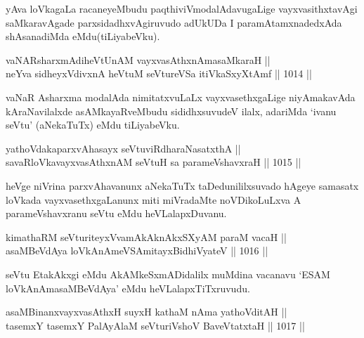 \begin{artha}
yAva loVkagaLa racaneyeMbudu paqthiviVmodalAdavugaLige vayxvasithxtavAgi saMkaravAgade parxsidadhxvAgiruvudo adUkUDa I paramAtamxnadedxAda shAsanadiMda eMdu(tiLiyabeVku).
\end{artha}


\begin{shl}
vaNARsharxmAdiheVtUnAM vayxvasAthxnAmasaMkaraH || \\
neYva sidheyxVdivxnA heVtuM seVtureVSa itiVkaSxyXtAmf \hfill || 1014 ||  
\end{shl}

\begin{artha}
vaNaR Asharxma modalAda nimitatxvuLaLx vayxvasethxgaLige niyAmakavAda kAraNavilalxde asAMkayaRveMbudu sididhxsuvudeV ilalx, adariMda `ivanu seVtu' (aNekaTuTx) eMdu tiLiyabeVku.
\end{artha}


\begin{shl}
yathoVdakaparxvAhasayx seVtuviRdharaNasatxthA || \\
savaRloVkavayxvasAthxnAM seVtuH sa parameVshavxraH \hfill || 1015 ||  
\end{shl}

\begin{artha}
heVge niVrina parxvAhavanunx aNekaTuTx taDedunililxsuvado hAgeye samasatx loVkada vayxvasethxgaLanunx miti miVradaMte noVDikoLuLxva A parameVshavxranu seVtu eMdu heVLalapxDuvanu.
\end{artha}

\begin{shl}
kimathaRM seVturiteyxVvamAkAknAkxSXyAM paraM vacaH || \\
asaMBeVdAya loVkAnAmeVSAmitayxBidhiVyateV \hfill || 1016 ||  
\end{shl}

\begin{artha}
seVtu EtakAkxgi eMdu AkAMkeSxmADidalilx muMdina vacanavu `ESAM loVkAnAmasaMBeVdAya' eMdu heVLalapxTiTxruvudu.
\end{artha}

\begin{shl}
asaMBinanxvayxvasAthxH suyxH kathaM nAma yathoVditAH || \\
tasemxY tasemxY PalAyAlaM seVturiVshoV BaveVtatxtaH \hfill || 1017 ||  
\end{shl}


